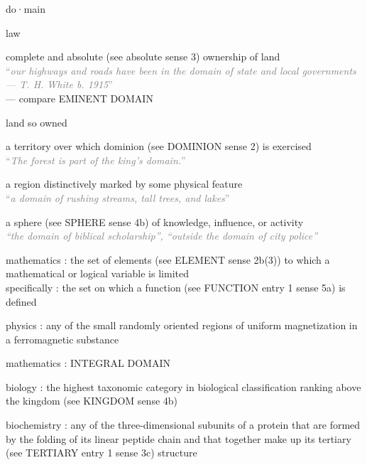 \documentclass[a4paper, DIV=13, BCOR=0cm]{scrbook}
\begin{document}
\begin{mdframed}[%
	linewidth=1pt,%
	frametitlerule=true,%
	frametitlebackgroundcolor=gray!20,%
	innertopmargin=\topskip,%
	frametitlefont=\normalfont,%
	frametitle={{\textbf{domain}} {\scriptsize\textsc{noun \hfill Merriam-Webster}}}%
	]
	
	{\small do·​main
			\begin{compactenum}
				\item law
				\begin{compactenum}
					\item complete and absolute (see absolute sense 3) ownership of land \\
					\textcolor{gray}{\enquote{\textit{our highways and roads have been in the domain of state and local governments— T. H. White b. 1915}}} \\
					 — compare EMINENT DOMAIN
					\item land so owned
				\end{compactenum}
				\item a territory over which dominion (see DOMINION sense 2) is exercised \\
				\textcolor{gray}{\enquote{\textit{The forest is part of the king's domain.}}}
				\item a region distinctively marked by some physical feature \\
				\textcolor{gray}{\enquote{\textit{a domain of rushing streams, tall trees, and lakes}}}
				\item a sphere (see SPHERE sense 4b) of knowledge, influence, or activity \\
				\textcolor{gray}{\textit{\enquote{the domain of biblical scholarship}, \enquote{outside the domain of city police}}}
				\item mathematics : the set of elements (see ELEMENT sense 2b(3)) to which a mathematical or logical variable is limited \\
				specifically : the set on which a function (see FUNCTION entry 1 sense 5a) is defined
				\item physics : any of the small randomly oriented regions of uniform magnetization in a ferromagnetic substance
				\item mathematics : INTEGRAL DOMAIN
				\item biology : the highest taxonomic category in biological classification ranking above the kingdom (see KINGDOM sense 4b)
				\item biochemistry : any of the three-dimensional subunits of a protein that are formed by the folding of its linear peptide chain and that together make up its tertiary (see TERTIARY entry 1 sense 3c) structure

\end{compactenum}}
\end{mdframed}
\end{document}
